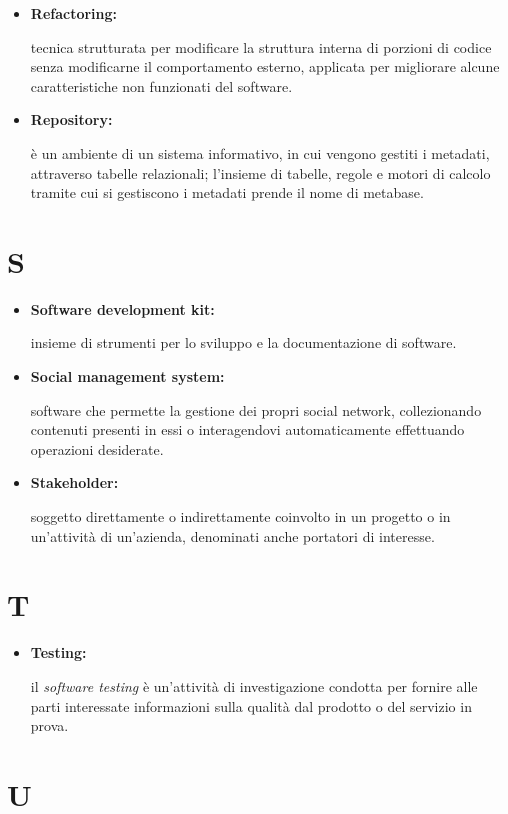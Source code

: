 \begin{itemize}
	\item \hypertarget{ref}{\textbf{Refactoring:}} tecnica strutturata per modificare la struttura interna di porzioni di codice senza modificarne il comportamento esterno, applicata per migliorare alcune caratteristiche non funzionati del software.
	
	\item \hypertarget{rep}{\textbf{Repository:}} è un ambiente di un sistema informativo, in cui vengono gestiti i metadati, attraverso tabelle relazionali; l'insieme di tabelle, regole e motori di calcolo tramite cui si gestiscono i metadati prende il nome di metabase.
	
\end{itemize}

\section*{S}

\begin{itemize}
	\item \hypertarget{sdk}{\textbf{Software development kit:}} insieme di strumenti per lo sviluppo e la documentazione di software.
	
	\item \hypertarget{sms}{\textbf{Social management system:}} software che permette la gestione dei propri social network, collezionando contenuti presenti in essi o interagendovi automaticamente effettuando operazioni desiderate.
	
	\item \hypertarget{sh}{\textbf{Stakeholder:}} soggetto direttamente o indirettamente coinvolto in un progetto o in un'attività di un'azienda, denominati anche portatori di interesse.
\end{itemize}

\section*{T}

\begin{itemize}
	\item \hypertarget{test}{\textbf{Testing:}} il \textit{software testing} è un'attività di investigazione condotta per fornire alle parti interessate informazioni sulla qualità dal prodotto o del servizio in prova.
\end{itemize}

\section*{U}

